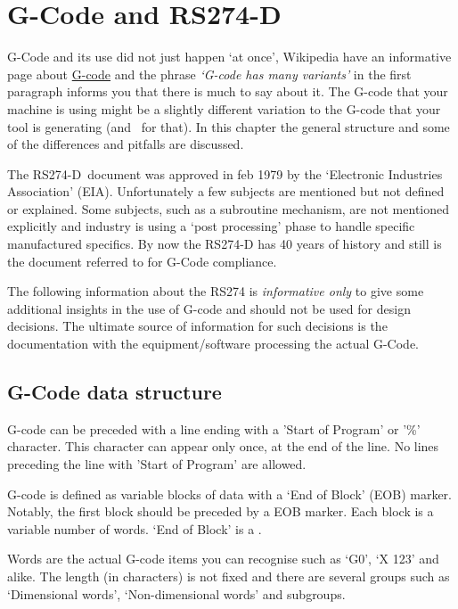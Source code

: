 \chapter{G-Code and RS274-D}\label{GCodeAndRs274D}

G-Code and its use did not just happen `at once', Wikipedia have an informative page about \href{https://en.wikipedia.org/wiki/G-code}{G-code}
and the phrase \emph{`G-code has many variants'} in the first paragraph informs you that there is much to say
about it. The G-code that your machine is using might be a slightly different variation to the G-code that your
tool is generating (and \GS\ for that). In this chapter the general structure and some of the differences and pitfalls are discussed.

The RS274-D\ document was approved in feb 1979 by the `Electronic Industries Association' (EIA).
Unfortunately a few subjects are mentioned but not defined or explained. Some subjects, such as a subroutine mechanism,
are not mentioned explicitly and industry is using a `post processing' phase to handle specific manufactured specifics.
By now the RS274-D has 40 years of history and still is the document referred to for G-Code compliance.

The following information about the RS274 is \emph{informative only} to give some additional insights in the use
of G-code and should not be used for design decisions. The ultimate source of information for such decisions is
the documentation with the equipment/software processing the actual G-Code.

\section{G-Code data structure}
G-code can be preceded with a line ending with a 'Start of Program' or
'\%' character.
This character can appear only once, at the end of the line. No lines preceding the line with 'Start of Program' are allowed.

G-code is defined as variable blocks of data with a `End of Block' (EOB) marker. Notably, the first block should
be preceded by a EOB marker. Each block is a variable number of words. `End of Block' is a \grammarnl.

Words are the actual G-code items you can recognise such as `G0', `X 123' and alike. The length (in characters) is
not fixed and there are several groups such as `Dimensional words', `Non-dimensional words' and subgroups.


